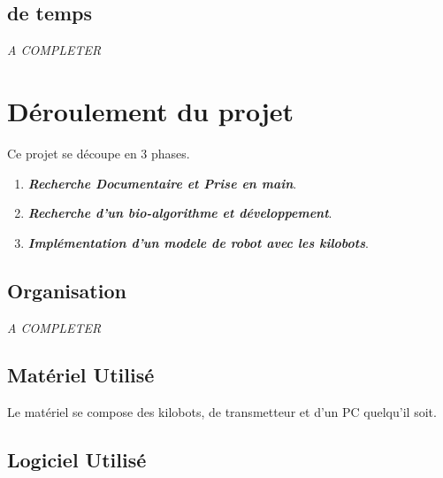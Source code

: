 \documentclass[a4paper,8pt]{report}
\begin{document}
\section*{de temps}\label{sec:name}

\textit{A COMPLETER}


\chapter{D\'eroulement du projet}

Ce projet se d\'ecoupe en 3 phases.\\

\begin{enumerate}[{Phase}-I ]
\item \textit{\textbf{Recherche Documentaire et Prise en main}}.
\item \textit{\textbf{Recherche d'un bio-algorithme et d\'eveloppement}}.
\item \textit{\textbf{Impl\'ementation d'un modele de robot avec les kilobots}}.
\end{enumerate}

\medskip
\section*{Organisation}\label{sec:name}

\textit{A COMPLETER}

\section*{Mat\'eriel Utilis\'e}\label{sec:name}

Le mat\'eriel se compose des kilobots, de transmetteur et d'un PC quelqu'il soit.

\section*{Logiciel Utilis\'e}\label{sec:name}
\end{document}

